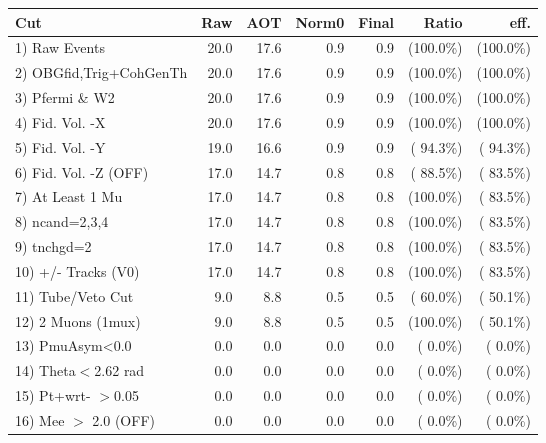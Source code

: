  \begin{table}[h!]\centering
 \begin{tabular}{||l||r|r|r|r|r|r||}
 \hline
 \hline
 Cut & Raw & AOT & Norm0 & Final & Ratio & eff.       \\
 \hline
  1) Raw Events           &         20.0 &         17.6 &          0.9 &          0.9 & (100.0\%) & (100.0\%) \\
  2) OBGfid,Trig+CohGenTh &         20.0 &         17.6 &          0.9 &          0.9 & (100.0\%) & (100.0\%) \\
  3) Pfermi \& W2         &         20.0 &         17.6 &          0.9 &          0.9 & (100.0\%) & (100.0\%) \\
  4) Fid. Vol. -X         &         20.0 &         17.6 &          0.9 &          0.9 & (100.0\%) & (100.0\%) \\
  5) Fid. Vol. -Y         &         19.0 &         16.6 &          0.9 &          0.9 & ( 94.3\%) & ( 94.3\%) \\
  6) Fid. Vol. -Z (OFF)   &         17.0 &         14.7 &          0.8 &          0.8 & ( 88.5\%) & ( 83.5\%) \\
  7) At Least 1 Mu        &         17.0 &         14.7 &          0.8 &          0.8 & (100.0\%) & ( 83.5\%) \\
  8) ncand=2,3,4          &         17.0 &         14.7 &          0.8 &          0.8 & (100.0\%) & ( 83.5\%) \\
  9) tnchgd=2             &         17.0 &         14.7 &          0.8 &          0.8 & (100.0\%) & ( 83.5\%) \\
 10) +/- Tracks (V0)      &         17.0 &         14.7 &          0.8 &          0.8 & (100.0\%) & ( 83.5\%) \\
 11) Tube/Veto Cut        &          9.0 &          8.8 &          0.5 &          0.5 & ( 60.0\%) & ( 50.1\%) \\
 12) 2 Muons (1mux)       &          9.0 &          8.8 &          0.5 &          0.5 & (100.0\%) & ( 50.1\%) \\
 13) PmuAsym<0.0          &          0.0 &          0.0 &          0.0 &          0.0 & (  0.0\%) & (  0.0\%) \\
 14) Theta$<$2.62 rad     &          0.0 &          0.0 &          0.0 &          0.0 & (  0.0\%) & (  0.0\%) \\
 15) Pt+wrt- $>$0.05      &          0.0 &          0.0 &          0.0 &          0.0 & (  0.0\%) & (  0.0\%) \\
 16) Mee $>$ 2.0  (OFF)   &          0.0 &          0.0 &          0.0 &          0.0 & (  0.0\%) & (  0.0\%) \\

\end{tabular}
\end{table}
